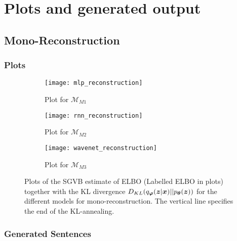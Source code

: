 
\appendix
\chapter{Plots and generated output}
\label{Appendix:output}

\section{Mono-Reconstruction}

\subsection{Plots}

\begin{figure}[H]
  \centering
  \begin{subfigure}[b]{0.55\textwidth}
    \centering
    \texttt{[image: mlp\_reconstruction]}
    \caption{Plot for $\mathcal{M}_{M1}$}
    \label{fig:recon_MLP}
  \end{subfigure}
  \begin{subfigure}[b]{0.55\textwidth}
    \centering
    \texttt{[image: rnn\_reconstruction]}
    \caption{Plot for $\mathcal{M}_{M2}$}
    \label{fig:recon_RNN}
  \end{subfigure}
  \begin{subfigure}[b]{0.55\textwidth}
    \centering
    \texttt{[image: wavenet\_reconstruction]}
    \caption{Plot for $\mathcal{M}_{M3}$}
    \label{fig:recon_WaveNet}
  \end{subfigure}
  \caption{Plots of the SGVB estimate of ELBO (Labelled ELBO in plots)
      together with the KL divergence $D_{KL}(q_{\bm{\varphi}}(\bm{z} |
        \bm{x}) || p_{\bm{\theta}}(\bm{z}))$ for the different models for mono-reconstruction. The
      vertical line specifies the end of the KL-annealing.}
\end{figure}

\subsection{Generated Sentences}

